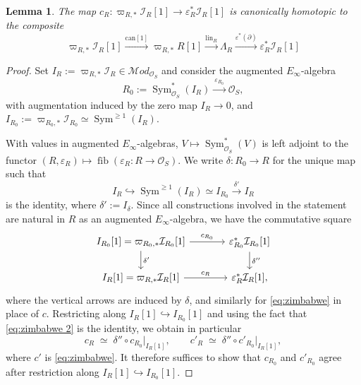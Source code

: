 \documentclass[12pt, oneside]{amsart}
\numberwithin{equation}{section}
\newtheorem{lemma}[subsubsection]{Lemma}
\theoremstyle{remark}
\theoremstyle{plain}
\renewcommand{\ge}{\geqslant}
\newcommand{\MOD}{\mathcal{M}\textit{od}}
\newcommand{\lam}{\Lambda}
\newcommand{\OO}{\mathcal{O}}
\DeclareMathOperator{\Sym}{Sym}
\newcommand{\eps}{\varepsilon}
\begin{document}
\begin{lemma}\label{lem:zimbabwe}
The map $c_R : \varpi_{R,*} \mathcal{I}_R [1] \to \eps_R^* \mathcal{I}_R [1]$ is canonically homotopic to the composite
\begin{equation}\label{eq:zimbabwe}
  \varpi_{R,*} \mathcal{I}_R [1]
  \xrightarrow{\mathrm{can}[1]} \varpi_{R,*} R [1]
  \xrightarrow{\mathrm{lin}_R} \lam_R
  \xrightarrow{\eps^*(\partial)} \eps_R^* \mathcal{I}_R [1]
\end{equation}
\end{lemma}
\begin{proof}
Set $I_R := \varpi_{R,*} \mathcal{I}_R \in \MOD_{\OO_S}$ and consider the augmented $E_\infty$-algebra
\[ R_0 := \Sym^*_{\OO_S}(I_R) \xrightarrow{\ \eps_{R_0}\ } \OO_S, \]
with augmentation induced by the zero map $I_R \to 0$, and $I_{R_0} := \varpi_{R_0,*} \mathcal{I}_{R_0} \simeq \Sym^{\ge 1}(I_R)$.

With values in augmented $E_\infty$-algebras, $V \mapsto \Sym^*_{\OO_S}(V)$ is left adjoint to the functor $(R, \eps_R) \mapsto \operatorname{fib}(\eps_R : R \to \OO_S)$.
We write $\delta : R_0 \to R$ for the unique map such that
\begin{equation}\label{eq:zimbabwe 2}
	I_R \hookrightarrow \Sym^{\ge 1}(I_R) \simeq I_{R_0} \xrightarrow{\delta'} I_R
\end{equation}
is the identity, where $\delta' := I_\delta$.
Since all constructions involved in the statement are natural in $R$ as an  augmented $E_\infty$-algebra, we have the commutative square
\[\begin{tikzcd}[column sep=large]
  I_{R_0}[1] = \varpi_{{R_0},*} \mathcal{I}_{R_0}[1] \arrow{r}{c_{R_0}} \arrow{d}{\delta'}
  & \eps_{R_0}^* \mathcal{I}_{R_0}[1] \arrow{d}{\delta''} \\
  I_{R}[1] = \varpi_{R,*} \mathcal{I}_R[1] \arrow{r}{c_R}
  & \eps_R^* \mathcal{I}_R[1],
\end{tikzcd}\]
where the vertical arrows are induced by $\delta$, and similarly for \eqref{eq:zimbabwe} in place of $c$.
Restricting along $I_R[1] \hookrightarrow I_{R_0}[1]$ and using the fact that \eqref{eq:zimbabwe 2} is the identity, we obtain in particular
\[
  c_R \;\simeq\; \delta'' \circ c_{R_0}\big|_{I_R[1]},
  \qquad
  c'_R \;\simeq\; \delta'' \circ c'_{R_0}\big|_{I_R[1]},
\]
where $c'$ is \eqref{eq:zimbabwe}.
It therefore suffices to show that $c_{R_0}$ and $c'_{R_0}$ agree after restriction along $I_R[1] \hookrightarrow I_{R_0}[1]$.


\end{proof}
\end{document}
